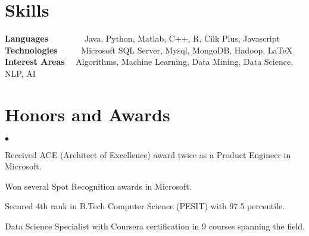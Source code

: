 \documentclass[margin,line,10.5pt]{res}
\newcommand{\tab}{\hspace*{2em}}
\newenvironment{list2}{
  \begin{list}{$\bullet$}{%
      \setlength{\itemsep}{0in}
      \setlength{\parsep}{0in} \setlength{\parskip}{0in}
      \setlength{\topsep}{0in} \setlength{\partopsep}{0in} 
      \setlength{\leftmargin}{0.2in}}}{\end{list}}
\begin{document}
\begin{resume}
\vspace{-.2cm}
\section{\sc Skills} 
 {\bf Languages} {\tab}\ \ \ \ \ \ \ \  Java, Python, Matlab, C++, R, Cilk Plus, Javascript\\
 {\bf Technologies} {\tab}\ \ \ \ \  Microsoft SQL Server, Mysql, MongoDB, Hadoop, LaTeX\\
 {\bf Interest Areas} {\tab}\ \  Algorithms, Machine Learning, Data Mining, Data Science, NLP, AI  \\
\vspace{-.51cm}
\section{\sc Honors and Awards} 
\begin{list2}
\item Received ACE (Architect of Excellence) award twice as a Product Engineer in Microsoft.
\item Won several Spot Recognition awards in Microsoft.
\item Secured 4th rank in B.Tech Computer Science (PESIT) with 97.5 percentile.
\item Data Science Specialist with Coursera certification in 9 courses spanning the field.
\end{list2}

\end{resume}
\end{document}
